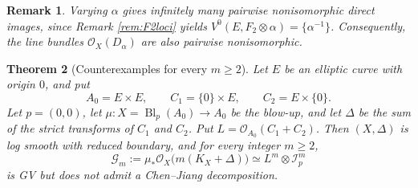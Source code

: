 \documentclass[11pt,letterpaper]{article}
\theoremstyle{paper}
\newtheorem{theorem}{Theorem}[section]
\newtheorem{remark}[theorem]{Remark}
\newcommand{\OO}{\mathcal O}
\newcommand{\GG}{\mathcal G}
\newcommand{\II}{\mathcal I}
\DeclareMathOperator{\Bl}{Bl}
\begin{document}
\begin{remark}
Varying $\alpha$ gives infinitely many pairwise nonisomorphic direct images, since Remark \ref{rem:F2loci} yields $V^0(E,F_2\otimes\alpha)=\{\alpha^{-1}\}$. Consequently, the line bundles $\OO_X(D_\alpha)$ are also pairwise nonisomorphic.
\end{remark}

\begin{theorem}[Counterexamples for every $m\ge2$]\label{thm:pluri}
Let $E$ be an elliptic curve with origin $0$, and put
\[
A_0=E\times E,\qquad C_1=\{0\}\times E,\qquad C_2=E\times\{0\}.
\]
Let $p=(0,0)$, let $\mu:X=\Bl_p(A_0)\to A_0$ be the blow-up, and let $\Delta$ be the sum of the strict transforms of $C_1$ and $C_2$. Put $L=\OO_{A_0}(C_1+C_2)$. Then $(X,\Delta)$ is log smooth with reduced boundary, and for every integer $m\ge2$,
\[
\GG_m:=\mu_*\OO_X\bigl(m(K_X+\Delta)\bigr)\simeq L^m\otimes\II_p^m
\]
is GV but does not admit a Chen--Jiang decomposition.
\end{theorem}
\end{document}
